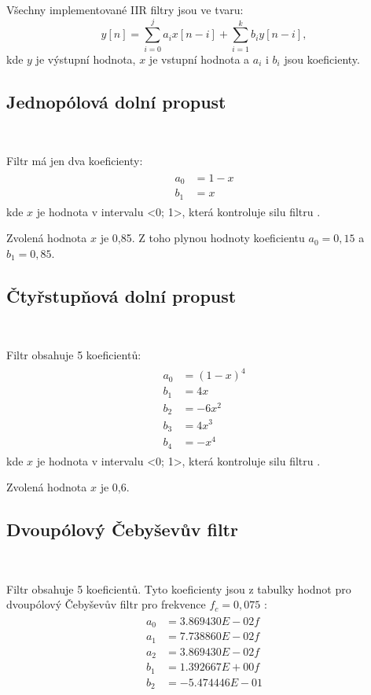 Všechny implementované IIR filtry jsou ve tvaru:
\begin{equation}
y[n] = \sum_{i = 0}^{j}a_{i}x[n - i] + \sum_{i = 1}^{k}b_{i}y[n - i],
\end{equation}
kde $y$ je výstupní hodnota, $x$ je vstupní hodnota a $a_i$ i $b_i$ jsou
koeficienty.

\subsection{Jednopólová dolní propust}\

Filtr má jen dva koeficienty:
\begin{align}
\begin{split}
a_0 &= 1 - x \\
b_1 &= x
\end{split}
\end{align}
kde $x$ je hodnota v intervalu <0; 1>, která kontroluje silu filtru \cite{Filters}.

Zvolená hodnota $x$ je 0,85. Z toho plynou hodnoty koeficientu $a_0 = 0,15$ a $b_1 =
0,85$.

\subsection{Čtyřstupňová dolní propust}\

Filtr obsahuje 5 koeficientů:
\begin{align}
\begin{split}
a_0 &= (1 - x)^4 \\
b_1 &= 4x \\
b_2 &= -6x^2 \\
b_3 &= 4x^3 \\
b_4 &= -x^4
\end{split}
\end{align}
kde $x$ je hodnota v intervalu <0; 1>, která kontroluje silu filtru \cite{Filters}.

Zvolená hodnota $x$ je 0,6.

\subsection{Dvoupólový Čebyševův filtr}\

Filtr obsahuje 5 koeficientů. Tyto koeficienty jsou z tabulky hodnot pro dvoupólový
Čebyševův filtr pro frekvence $f_c = 0,075$ \cite{Filters}:
\begin{align}
\begin{split}
a_0 &= 3.869430E-02f \\
a_1 &= 7.738860E-02f \\
a_2 &= 3.869430E-02f \\
b_1 &= 1.392667E+00f \\
b_2 &= -5.474446E-01 \\
\end{split}
\end{align}

